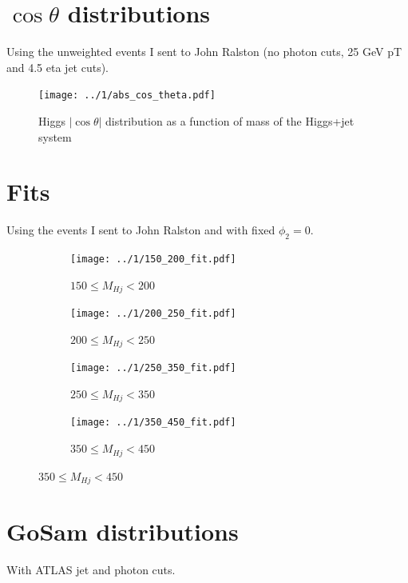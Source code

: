 \documentclass[12pt]{article}
\begin{document}
\section{\texorpdfstring{$\cos\theta$}{cos theta} distributions}
Using the unweighted events I sent to John Ralston
(no photon cuts, 25 GeV pT and 4.5 eta jet cuts).
\begin{figure}[H]
  \centering
  \texttt{[image: ../1/abs\_cos\_theta.pdf]}
  \caption{Higgs $|\!\cos\theta|$ distribution as a function of mass of the Higgs+jet system}
\end{figure}

\pagebreak

\section{Fits}
Using the events I sent to John Ralston and with fixed $\phi_2 = 0$.

\begin{figure}[H]
  \centering
  \begin{subfigure}[b]{0.49\textwidth}
    \centering
    \caption{$150\leq M_{Hj}<200$}
    \texttt{[image: ../1/150\_200\_fit.pdf]}
  \end{subfigure}
  \begin{subfigure}[b]{0.49\textwidth}
    \centering
    \caption{$200\leq M_{Hj}<250$}
    \texttt{[image: ../1/200\_250\_fit.pdf]}
  \end{subfigure}
  \begin{subfigure}[b]{0.49\textwidth}
    \centering
    \caption{$250\leq M_{Hj}<350$}
    \texttt{[image: ../1/250\_350\_fit.pdf]}
  \end{subfigure}
  \begin{subfigure}[b]{0.49\textwidth}
    \centering
    \caption{$350\leq M_{Hj}<450$}
    \texttt{[image: ../1/350\_450\_fit.pdf]}
  \end{subfigure}
\end{figure}

\pagebreak

\section{GoSam distributions}
With ATLAS jet and photon cuts.
\end{document}

